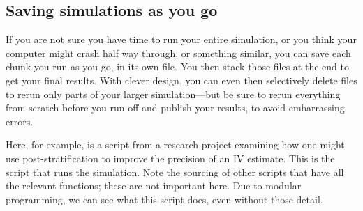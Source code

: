 \documentclass[
]{book}
\begin{document}
\hypertarget{saving-simulations-as-you-go}{%
\subsection{Saving simulations as you go}\label{saving-simulations-as-you-go}}

If you are not sure you have time to run your entire simulation, or you think your computer might crash half way through, or something similar, you can save each chunk you run as you go, in its own file. You then stack those files at the end to get your final results.
With clever design, you can even then selectively delete files to rerun only parts of your larger simulation---but be sure to rerun everything from scratch before you run off and publish your results, to avoid embarrassing errors.

Here, for example, is a script from a research project examining how one might use post-stratification to improve the precision of an IV estimate.
This is the script that runs the simulation.
Note the sourcing of other scripts that have all the relevant functions; these are not important here.
Due to modular programming, we can see what this script does, even without those detail.
\end{document}
